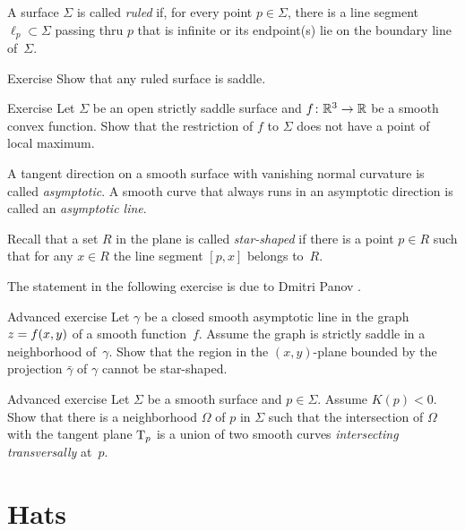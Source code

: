 A surface $\Sigma$ is called \emph{ruled} if, for every point $p\in \Sigma$, there is a line segment $\ell_p\subset \Sigma$ passing thru $p$ that is infinite or its endpoint(s) lie on the boundary line of~$\Sigma$.

\begin{thm}{Exercise}\label{ex:ruled=>saddle}
Show that any ruled surface is saddle.
\end{thm}

\begin{thm}{Exercise}\label{ex:saddle-convex}
Let $\Sigma$ be an open strictly saddle surface and $f\:\mathbb{R}^3\z\to\mathbb{R}$ be a smooth convex function.
Show that the restriction of $f$ to $\Sigma$ does not have a point of local maximum.
\end{thm}

A tangent direction on a smooth surface with vanishing normal curvature is called \emph{asymptotic}.
A smooth curve that always runs in an asymptotic direction is called an
{}\emph{asymptotic line}.\label{page:asymptotic line}

Recall that a set $R$ in the plane is called \emph{star-shaped} if there is a point $p\in R$ such that for any $x\in R$ the line segment $[p,x]$ belongs to~$R$.

The statement in the following exercise is due to Dmitri Panov \cite{panov-curves}.

\begin{thm}{Advanced exercise}\label{ex:panov}
Let $\gamma$ be a closed smooth asymptotic line
in the graph $z\z=f(x,y)$ of a smooth function~$f$. 
Assume the graph is strictly saddle in a neighborhood of~$\gamma$.
Show that the region in the $(x,y)$-plane bounded by the projection $\bar \gamma$ of $\gamma$ cannot be star-shaped. 
\end{thm}

\begin{thm}{Advanced exercise}\label{ex:crosss}
Let $\Sigma$ be a smooth surface and $p\in \Sigma$.
Assume $K(p)<0$.
Show that there is a neighborhood $\Omega$ of $p$ in $\Sigma$
such that the intersection of $\Omega$ with the tangent plane $\mathrm{T}_p$ is a union of two smooth curves  \emph{intersecting transversally} at~$p$.
\end{thm}


\section{Hats}

